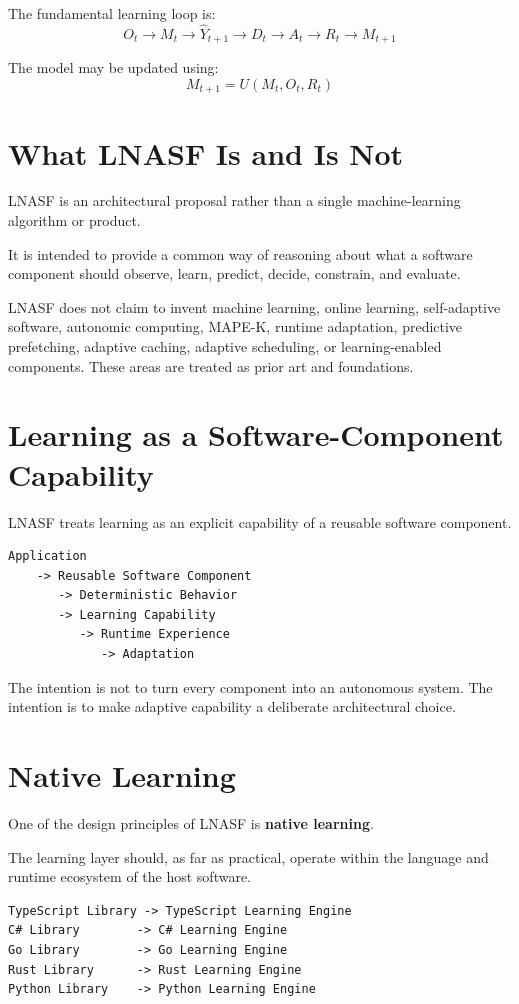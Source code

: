 \documentclass[11pt,a4paper]{article}
\begin{document}
The fundamental learning loop is:
\[
O_t \rightarrow M_t \rightarrow \hat{Y}_{t+1} \rightarrow D_t \rightarrow A_t \rightarrow R_t \rightarrow M_{t+1}
\]

The model may be updated using:
\[
M_{t+1}=U(M_t,O_t,R_t)
\]

\section{What LNASF Is and Is Not}
LNASF is an architectural proposal rather than a single machine-learning algorithm or product.

It is intended to provide a common way of reasoning about what a software component should observe, learn, predict, decide, constrain, and evaluate.

LNASF does not claim to invent machine learning, online learning, self-adaptive software, autonomic computing, MAPE-K, runtime adaptation, predictive prefetching, adaptive caching, adaptive scheduling, or learning-enabled components. These areas are treated as prior art and foundations.

\section{Learning as a Software-Component Capability}
LNASF treats learning as an explicit capability of a reusable software component.

\begin{lstlisting}
Application
    -> Reusable Software Component
       -> Deterministic Behavior
       -> Learning Capability
          -> Runtime Experience
             -> Adaptation
\end{lstlisting}

The intention is not to turn every component into an autonomous system. The intention is to make adaptive capability a deliberate architectural choice.

\section{Native Learning}
One of the design principles of LNASF is \textbf{native learning}.

The learning layer should, as far as practical, operate within the language and runtime ecosystem of the host software.

\begin{lstlisting}
TypeScript Library -> TypeScript Learning Engine
C# Library        -> C# Learning Engine
Go Library        -> Go Learning Engine
Rust Library      -> Rust Learning Engine
Python Library    -> Python Learning Engine
\end{lstlisting}
\end{document}
